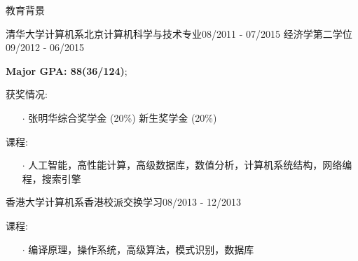 \documentclass{resume} %
\begin{document}
\vspace{-1.5em}
\begin{rSection}{教育背景}
\begin{eSubsection}{清华大学计算机系}{北京}{计算机科学与技术专业}{08/2011 - 07/2015}
{经济学第二学位}{09/2012 - 06/2015}
\item \textbf{Major GPA: 88(36/124)};
\item 获奖情况:
\begin{itemize}
\itemsep -0.5em \vspace{-0.5em}
\item[$\cdot$] 张明华综合奖学金 (20\%) 新生奖学金 (20\%)
\end{itemize}
\item 课程:
	\begin{itemize}
	\itemsep -0.5em \vspace{-0.5em}
	\item[$\cdot$] 人工智能，高性能计算，高级数据库，数值分析，计算机系统结构，网络编程，搜索引擎
	\end{itemize}
\end{eSubsection}
\vspace{-0.8em}
\begin{rSubsection}{香港大学计算机系}{香港}{校派交换学习}{08/2013 - 12/2013}
\item 课程:
	\begin{itemize}
	\itemsep -0.5em \vspace{-0.5em}
	\item[$\cdot$] 编译原理，操作系统，高级算法，模式识别，数据库
	\end{itemize}
\end{rSubsection}
\end{rSection}
\vspace{-1.0em}
\end{document}
